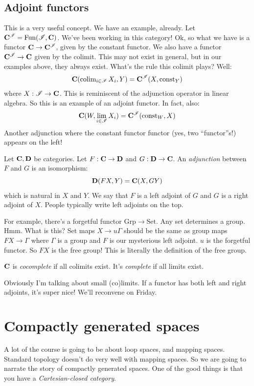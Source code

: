 \subsection{Adjoint functors}
This is a very useful concept. We have an example, already. Let $\mathbf C^\mathscr I = \operatorname{Fun}(\mathscr I,\mathbf C)$. We've been working in this category! Ok, so what we have is a functor $\mathbf C\to \mathbf C^\mathscr I$, given by the constant functor. We also have a functor $\mathbf C^\mathscr I\to \mathbf C$ given by the colimit. This may not exist in general, but in our examples above, they always exist. What's the rule this colimit plays? Well:
$$\mathbf C(\operatorname{colim}_{i\in \mathscr I} X_i,Y) = \mathbf C^\mathscr I(X,\mathrm{const}_Y)$$
where $X:\mathscr I\to\mathbf C$. This is reminiscent of the adjunction operator in linear algebra. So this is an example of an adjoint functor. In fact, also:
$$\mathbf C(W,\lim_{i\in \mathscr I} X_i) = \mathbf C^{\mathscr I}(\mathrm{const}_W,X)$$
Another adjunction where the constant functor functor (yes, two ``functor''s!) appears on the left!
\begin{definition}
    Let $\mathbf C,\mathbf D$ be categories. Let $F:\mathbf C\to \mathbf D$ and $G:\mathbf D\to\mathbf C$. An \emph{adjunction} between $F$ and $G$ is an isomorphism:
    $$\mathbf D(FX,Y) = \mathbf C(X,GY)$$
    which is natural in $X$ and $Y$. We say that $F$ is a left adjoint of $G$ and $G$ is a right adjoint of $X$. People typically write left adjoints on the top.
\end{definition}
For example, there's a forgetful functor $\mathrm{Grp}\to\mathrm{Set}$. Any set determines a group. Hmm. What is this? Set maps $X\to u\Gamma$ should be the same as group maps $FX\to \Gamma$ where $\Gamma$ is a group and $F$ is our mysterious left adjoint. $u$ is the forgetful functor. So $FX$ is the free group! This is literally the definition of the free group.
\begin{definition}
    $\mathbf C$ is \emph{cocomplete} if all colimits exist. It's \emph{complete} if all limits exist.
\end{definition}
Obviously I'm talking about small (co)limits. If a functor has both left and right adjoints, it's super nice! We'll reconvene on Friday.

\section{Compactly generated spaces}
A lot of the course is going to be about loop spaces, and mapping spaces. Standard topology doesn't do very well with mapping spaces. So we are going to narrate the story of compactly generated spaces. One of the good things is that you have a \emph{Cartesian-closed category}.

